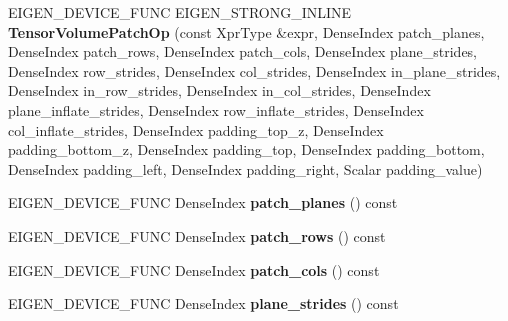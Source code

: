 \begin{DoxyCompactItemize}
\item 
\mbox{\label{class_eigen_1_1_tensor_volume_patch_op_a2b9eb5266ca20600764f7c7f03e09d40}} 
E\+I\+G\+E\+N\+\_\+\+D\+E\+V\+I\+C\+E\+\_\+\+F\+U\+NC E\+I\+G\+E\+N\+\_\+\+S\+T\+R\+O\+N\+G\+\_\+\+I\+N\+L\+I\+NE {\bfseries Tensor\+Volume\+Patch\+Op} (const Xpr\+Type \&expr, Dense\+Index patch\+\_\+planes, Dense\+Index patch\+\_\+rows, Dense\+Index patch\+\_\+cols, Dense\+Index plane\+\_\+strides, Dense\+Index row\+\_\+strides, Dense\+Index col\+\_\+strides, Dense\+Index in\+\_\+plane\+\_\+strides, Dense\+Index in\+\_\+row\+\_\+strides, Dense\+Index in\+\_\+col\+\_\+strides, Dense\+Index plane\+\_\+inflate\+\_\+strides, Dense\+Index row\+\_\+inflate\+\_\+strides, Dense\+Index col\+\_\+inflate\+\_\+strides, Dense\+Index padding\+\_\+top\+\_\+z, Dense\+Index padding\+\_\+bottom\+\_\+z, Dense\+Index padding\+\_\+top, Dense\+Index padding\+\_\+bottom, Dense\+Index padding\+\_\+left, Dense\+Index padding\+\_\+right, Scalar padding\+\_\+value)
\item 
\mbox{\label{class_eigen_1_1_tensor_volume_patch_op_a4717a5f0dce3370fb6ef4c1683a539ea}} 
E\+I\+G\+E\+N\+\_\+\+D\+E\+V\+I\+C\+E\+\_\+\+F\+U\+NC Dense\+Index {\bfseries patch\+\_\+planes} () const
\item 
\mbox{\label{class_eigen_1_1_tensor_volume_patch_op_ae5d5a1fd280f5c7f1f6e6313f8f43b50}} 
E\+I\+G\+E\+N\+\_\+\+D\+E\+V\+I\+C\+E\+\_\+\+F\+U\+NC Dense\+Index {\bfseries patch\+\_\+rows} () const
\item 
\mbox{\label{class_eigen_1_1_tensor_volume_patch_op_ae0dbc8f349fd171b2fc59a07b1582b62}} 
E\+I\+G\+E\+N\+\_\+\+D\+E\+V\+I\+C\+E\+\_\+\+F\+U\+NC Dense\+Index {\bfseries patch\+\_\+cols} () const
\item 
\mbox{\label{class_eigen_1_1_tensor_volume_patch_op_a05afb9a406a9a8ca58c4105c3bc63e44}} 
E\+I\+G\+E\+N\+\_\+\+D\+E\+V\+I\+C\+E\+\_\+\+F\+U\+NC Dense\+Index {\bfseries plane\+\_\+strides} () const
\item 
\mbox{\label{class_eigen_1_1_tensor_volume_patch_op_a8624b86945a5d22eaca15010f9094cda}} 

\end{DoxyCompactItemize}
